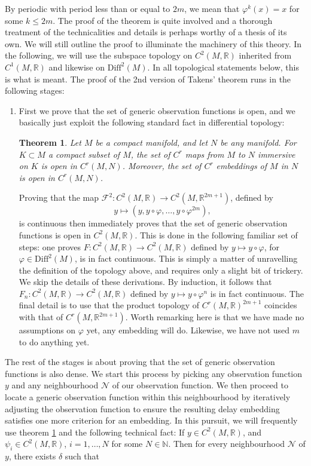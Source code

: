 \documentclass[11pt, a4paper]{memoir}
\theoremstyle{break}
\newtheorem{thm}{Theorem}
\theoremstyle{break}
\theoremstyle{nonumberplain}
\newcommand{\mN}{\mathbb{N}}
\newcommand{\mR}{\mathbb{R}}
\begin{document}
By periodic with period less than or equal to $2m$, we mean that $\varphi^{k}(x)=x$ for some $k\leqslant 2m$. The proof of the theorem is quite involved and a thorough treatment of the technicalities and details is perhaps worthy of a thesis of its own. We will still outline the proof to illuminate the machinery of this theory. In the following, we will use the subspace topology on $C^2(M,\mR)$ inherited from $C^1(M,\mR)$ and likewise on $\text{Diff}^2(M)$. In all topological statements below, this is what is meant. The proof of the 2nd version of Takens' theorem runs in the following stages:
\begin{enumerate}[label=\roman*)]
	\item First we prove that the set of generic observation functions is open, and we basically just exploit the following standard fact in differential topology:
	\begin{thm}\label{tool}
	Let $M$ be a compact manifold, and let $N$ be any manifold. For $K\subset M$ a compact subset of $M$, the set of $C^r$ maps from $M$ to $N$ immersive on $K$ is open in $C^r(M,N)$. Moreover, the set of $C^r$ embeddings of $M$ in $N$ is open in $C^r(M,N)$. \cite{hirsch}
	\end{thm}
	Proving that the map $\mathcal{F}^2: C^2(M,\mR)\to C^2(M,\mR^{2m+1})$, defined by $$y\mapsto (y,y\circ\varphi,\ldots, y\circ \varphi^{2m}),$$ 
	is continuous then immediately proves that the set of generic observation functions is open in $C^2(M,\mR)$. This is done in the following familiar set of steps: one proves $F: C^2(M,\mR)\to C^2(M,\mR)$ defined by $y\mapsto y\circ\varphi$, for $\varphi\in \text{Diff}^2(M)$, is in fact continuous.  This is simply a matter of unravelling the definition of the topology above, and requires only a slight bit of trickery. We skip the details of these derivations. By induction, it follows that $F_n:  C^2(M,\mR)\to C^2(M,\mR)$ defined by $y\mapsto y\circ\varphi^n$ is in fact continuous.  The final detail is to use that the product topology of $C^r(M,\mR)^{2m+1}$ coincides with that of $C^r(M,\mR^{2m+1})$. Worth remarking here is that we have made no assumptions on $\varphi$ yet, any embedding will do. Likewise, we have not used $m$ to do anything yet. 
\end{enumerate}
The rest of the stages is about proving that the set of generic observation functions is also dense. We start this process by picking any observation function $y$ and any neighbourhood $\mathcal{N}$ of our observation function. We then proceed to locate a generic observation function within this neighbourhood by iteratively adjusting the observation function to ensure the resulting delay embedding satisfies one more criterion for an embedding. In this pursuit, we will frequently use theorem \ref{tool} and the following technical fact: If $y\in C^2(M,\mR)$, and $\psi_i\in C^2(M,\mR)$, $i=1,\ldots,N$ for some $N\in \mN$. Then for every neighbourhood $\mathcal{N}$ of $y$, there exists $\delta$ such that
\end{document}
